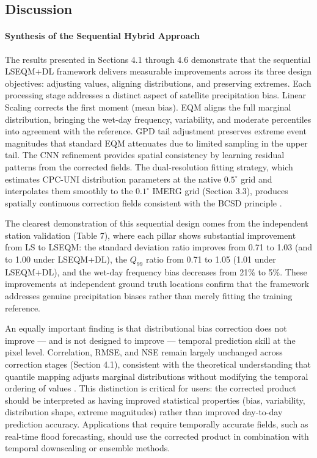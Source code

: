 \documentclass[remotesensing,article,submit,pdftex,moreauthors]{Definitions/mdpi}
\begin{document}
\subsection{Discussion}\label{discussion}

\paragraph{Synthesis of the Sequential Hybrid
Approach}

The results presented in Sections 4.1 through 4.6 demonstrate that the
sequential LSEQM+DL framework delivers measurable improvements across
its three design objectives: adjusting values, aligning distributions,
and preserving extremes. Each processing stage addresses a distinct
aspect of satellite precipitation bias. Linear Scaling corrects the
first moment (mean bias). EQM aligns the full marginal distribution,
bringing the wet-day frequency, variability, and moderate percentiles
into agreement with the reference. GPD tail adjustment preserves extreme
event magnitudes that standard EQM attenuates due to limited sampling in
the upper tail. The CNN refinement provides spatial consistency by
learning residual patterns from the corrected fields. The
dual-resolution fitting strategy, which estimates CPC-UNI distribution
parameters at the native \(0.5^{\circ}\) grid and interpolates them
smoothly to the \(0.1^{\circ}\) IMERG grid (Section 3.3), produces
spatially continuous correction fields consistent with the BCSD
principle \cite{ref23}.

The clearest demonstration of this sequential design comes from the
independent station validation (Table 7), where each pillar shows
substantial improvement from LS to LSEQM: the standard deviation ratio
improves from 0.71 to 1.03 (and to 1.00 under LSEQM+DL), the \(Q_{99}\)
ratio from 0.71 to 1.05 (1.01 under LSEQM+DL), and the wet-day frequency
bias decreases from 21\% to 5\%. These improvements at independent
ground truth locations confirm that the framework addresses genuine
precipitation biases rather than merely fitting the training reference.

An equally important finding is that distributional bias correction does
not improve --- and is not designed to improve --- temporal prediction
skill at the pixel level. Correlation, RMSE, and NSE remain largely
unchanged across correction stages (Section 4.1), consistent with the
theoretical understanding that quantile mapping adjusts marginal
distributions without modifying the temporal ordering of values
\cite{ref34}. This distinction is critical for users: the corrected product
should be interpreted as having improved statistical properties (bias,
variability, distribution shape, extreme magnitudes) rather than
improved day-to-day prediction accuracy. Applications that require
temporally accurate fields, such as real-time flood forecasting, should
use the corrected product in combination with temporal downscaling or
ensemble methods.
\end{document}
